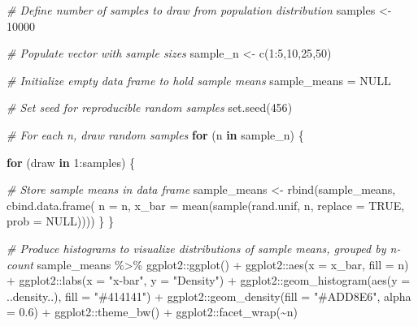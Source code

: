 \documentclass[
]{book}
\newenvironment{Shaded}{\begin{snugshade}}{\end{snugshade}}
\newcommand{\AttributeTok}[1]{\textcolor[rgb]{0.77,0.63,0.00}{#1}}
\newcommand{\CommentTok}[1]{\textcolor[rgb]{0.56,0.35,0.01}{\textit{#1}}}
\newcommand{\ConstantTok}[1]{\textcolor[rgb]{0.00,0.00,0.00}{#1}}
\newcommand{\ControlFlowTok}[1]{\textcolor[rgb]{0.13,0.29,0.53}{\textbf{#1}}}
\newcommand{\DecValTok}[1]{\textcolor[rgb]{0.00,0.00,0.81}{#1}}
\newcommand{\FloatTok}[1]{\textcolor[rgb]{0.00,0.00,0.81}{#1}}
\newcommand{\FunctionTok}[1]{\textcolor[rgb]{0.00,0.00,0.00}{#1}}
\newcommand{\NormalTok}[1]{#1}
\newcommand{\OtherTok}[1]{\textcolor[rgb]{0.56,0.35,0.01}{#1}}
\newcommand{\SpecialCharTok}[1]{\textcolor[rgb]{0.00,0.00,0.00}{#1}}
\newcommand{\StringTok}[1]{\textcolor[rgb]{0.31,0.60,0.02}{#1}}
\begin{document}
\begin{Shaded}
\begin{Highlighting}[]
\CommentTok{\# Define number of samples to draw from population distribution}
\NormalTok{samples }\OtherTok{\textless{}{-}} \DecValTok{10000}

\CommentTok{\# Populate vector with sample sizes}
\NormalTok{sample\_n }\OtherTok{\textless{}{-}} \FunctionTok{c}\NormalTok{(}\DecValTok{1}\SpecialCharTok{:}\DecValTok{5}\NormalTok{,}\DecValTok{10}\NormalTok{,}\DecValTok{25}\NormalTok{,}\DecValTok{50}\NormalTok{)}

\CommentTok{\# Initialize empty data frame to hold sample means}
\NormalTok{sample\_means }\OtherTok{=} \ConstantTok{NULL}

\CommentTok{\# Set seed for reproducible random samples}
\FunctionTok{set.seed}\NormalTok{(}\DecValTok{456}\NormalTok{)}

\CommentTok{\# For each n, draw random samples}
\ControlFlowTok{for}\NormalTok{ (n }\ControlFlowTok{in}\NormalTok{ sample\_n) \{}
  
  \ControlFlowTok{for}\NormalTok{ (draw }\ControlFlowTok{in} \DecValTok{1}\SpecialCharTok{:}\NormalTok{samples) \{}
    
      \CommentTok{\# Store sample means in data frame}
\NormalTok{      sample\_means }\OtherTok{\textless{}{-}} \FunctionTok{rbind}\NormalTok{(sample\_means, }\FunctionTok{cbind.data.frame}\NormalTok{(}
                            \AttributeTok{n =}\NormalTok{ n, }
                            \AttributeTok{x\_bar =} \FunctionTok{mean}\NormalTok{(}\FunctionTok{sample}\NormalTok{(rand.unif, n, }\AttributeTok{replace =} \ConstantTok{TRUE}\NormalTok{, }\AttributeTok{prob =} \ConstantTok{NULL}\NormalTok{))))}
\NormalTok{  \}}
\NormalTok{\}}

\CommentTok{\# Produce histograms to visualize distributions of sample means, grouped by n{-}count}
\NormalTok{sample\_means }\SpecialCharTok{\%\textgreater{}\%}\NormalTok{ ggplot2}\SpecialCharTok{::}\FunctionTok{ggplot}\NormalTok{() }\SpecialCharTok{+} 
\NormalTok{                 ggplot2}\SpecialCharTok{::}\FunctionTok{aes}\NormalTok{(}\AttributeTok{x =}\NormalTok{ x\_bar, }\AttributeTok{fill =}\NormalTok{ n) }\SpecialCharTok{+} 
\NormalTok{                 ggplot2}\SpecialCharTok{::}\FunctionTok{labs}\NormalTok{(}\AttributeTok{x =} \StringTok{"x{-}bar"}\NormalTok{, }\AttributeTok{y =} \StringTok{"Density"}\NormalTok{) }\SpecialCharTok{+} 
\NormalTok{                 ggplot2}\SpecialCharTok{::}\FunctionTok{geom\_histogram}\NormalTok{(}\FunctionTok{aes}\NormalTok{(}\AttributeTok{y =}\NormalTok{ ..density..), }\AttributeTok{fill =} \StringTok{"\#414141"}\NormalTok{) }\SpecialCharTok{+}
\NormalTok{                 ggplot2}\SpecialCharTok{::}\FunctionTok{geom\_density}\NormalTok{(}\AttributeTok{fill =} \StringTok{"\#ADD8E6"}\NormalTok{, }\AttributeTok{alpha =} \FloatTok{0.6}\NormalTok{) }\SpecialCharTok{+}
\NormalTok{                 ggplot2}\SpecialCharTok{::}\FunctionTok{theme\_bw}\NormalTok{() }\SpecialCharTok{+}
\NormalTok{                 ggplot2}\SpecialCharTok{::}\FunctionTok{facet\_wrap}\NormalTok{(}\SpecialCharTok{\textasciitilde{}}\NormalTok{n)}
\end{Highlighting}
\end{Shaded}
\end{document}
